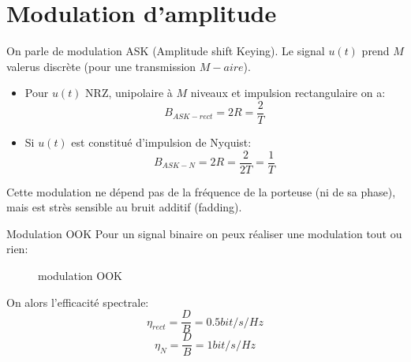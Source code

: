 \documentclass[main.tex]{subfiles}
\begin{document}
\section{Modulation d'amplitude}
On parle de modulation ASK (Amplitude shift Keying).
Le signal $u(t)$ prend $M$ valerus discrète (pour une transmission $M-aire$).
\begin{prop}
  \begin{itemize}
  \item Pour $u(t)$ NRZ, unipolaire à $M$ niveaux et impulsion rectangulaire on
    a:
  \[
    B_{ASK-rect} = 2R = \frac{2}{T}
  \]
\item Si $u(t)$ est constitué d'impulsion de Nyquist:
  \[
    B_{ASK-N} = 2R = \frac{2}{2T} =\frac{1}{T}
  \]
\end{itemize}
\end{prop}
\begin{rem}
 Cette modulation ne dépend pas de la fréquence de la porteuse (ni de sa phase), mais est strès sensible au bruit additif (fadding).
\end{rem}
\begin{exemple}
{Modulation OOK}
Pour un signal binaire on peux réaliser une modulation tout ou rien:
  \begin{figure}[H]
    \centering
    \caption{modulation OOK}
  \end{figure}
  On alors l'efficacité spectrale:
  \[
    \eta_{rect}  = \frac{D}{B} = 0.5 bit/s/Hz
  \]
  \[
    \eta_{N} = \frac{D}{B} = 1 bit/s/Hz
  \]
\end{exemple}
\end{document}
